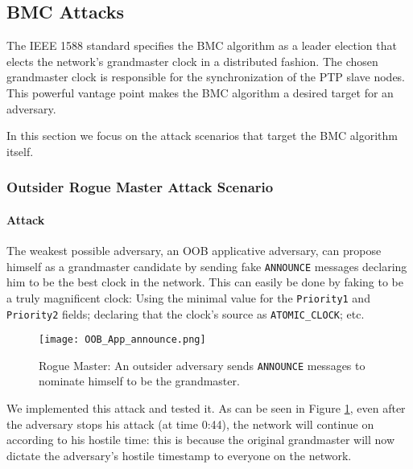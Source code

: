 \documentclass[11pt]{article}
\begin{document}
\subsection{BMC Attacks}\label{attack:bmc}



The IEEE 1588 standard specifies the BMC algorithm as a leader election that elects the network's grandmaster clock in a distributed fashion. The chosen grandmaster clock is responsible for the synchronization of the PTP slave nodes. This powerful vantage point makes the BMC algorithm a desired target for an adversary.

In this section we  focus on the attack scenarios that target the BMC algorithm itself.



\subsubsection{Outsider Rogue Master Attack Scenario}\label{bmc:scenrio1}

\paragraph{Attack}

The weakest possible adversary, an OOB applicative adversary, can propose himself as a grandmaster candidate by sending fake \texttt{ANNOUNCE} messages declaring him to be the best clock in the network. This can easily be done by faking to be a truly magnificent clock: Using the minimal value for the \texttt{Priority1} and \texttt{Priority2} fields; declaring that the clock's source as \texttt{ATOMIC_CLOCK}; etc.



\begin{figure}[t]

\centerline{\texttt{[image: OOB\_App\_announce.png]}}

\caption{Rogue Master: An outsider adversary sends \texttt{ANNOUNCE} messages to nominate himself to be the grandmaster.}

\label{Rogue Master}

\end{figure}



We implemented this attack and tested it. As can be seen in Figure \ref{Rogue Master}, even after the adversary stops his attack (at time 0:44), the network will continue on according to his hostile time: this is because the original grandmaster will now dictate the adversary's hostile timestamp to everyone on the network.
\end{document}
